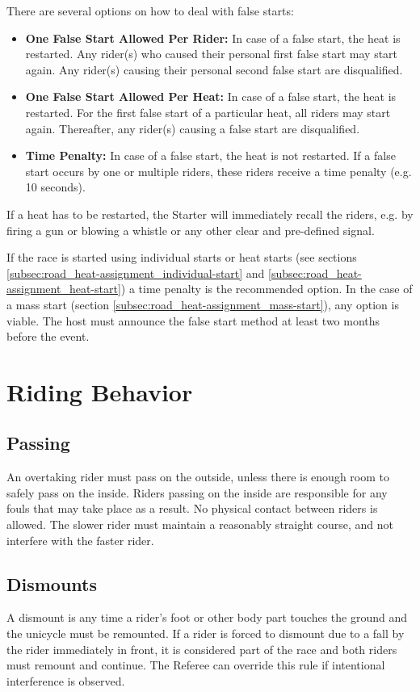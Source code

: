 There are several options on how to deal with false starts:
\begin{itemize}
\item \textbf{One False Start Allowed Per Rider:}
In case of a false start, the heat is restarted.
Any rider(s) who caused their personal first false start may start again.
Any rider(s) causing their personal second false start are disqualified.
\item \textbf{One False Start Allowed Per Heat:} 
In case of a false start, the heat is restarted.
For the first false start of a particular heat, all riders may start again.
Thereafter, any rider(s) causing a false start are disqualified.
\item \textbf{Time Penalty:}
In case of a false start, the heat is not restarted.
If a false start occurs by one or multiple riders, these riders receive a time penalty (e.g. 10 seconds).
\end{itemize}
If a heat has to be restarted, the Starter will immediately recall the riders, e.g. by firing a gun or blowing a whistle or any other clear and pre-defined signal.

If the race is started using individual starts or heat starts (see sections \ref{subsec:road_heat-assignment_individual-start} and \ref{subsec:road_heat-assignment_heat-start}) a time penalty is the recommended option.
In the case of a mass start (section \ref{subsec:road_heat-assignment_mass-start}), any option is viable.
The host must announce the false start method at least two months before the event.

\section{Riding Behavior}

\subsection{Passing}
An overtaking rider must pass on the outside, unless there is enough room to safely pass on the inside.
Riders passing on the inside are responsible for any fouls that may take place as a result.
No physical contact between riders is allowed.
The slower rider must maintain a reasonably straight course, and not interfere with the faster rider.

\subsection{Dismounts}
A dismount is any time a rider’s foot or other body part touches the ground and the unicycle must be remounted.
If a rider is forced to dismount due to a fall by the rider immediately in front, it is considered part of the race and both riders must remount and continue.
The Referee can override this rule if intentional interference is observed.

